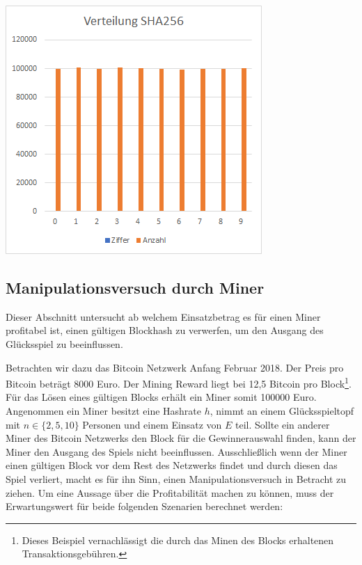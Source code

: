 \begin{minipage}{0.5\textwidth}
\includegraphics[width=\textwidth]{Figures/verteilung_sha256}
\centering
\decoRule
{}
\label{fig:verteilung_sha256}
\end{minipage}


\subsection{Manipulationsversuch durch Miner} \label{btc_eval_miner}
Dieser Abschnitt untersucht ab welchem Einsatzbetrag es für einen Miner profitabel ist, einen gültigen Blockhash zu verwerfen, um den Ausgang des Glücksspiel zu beeinflussen.

Betrachten wir dazu das Bitcoin Netzwerk Anfang Februar 2018. Der Preis pro Bitcoin beträgt 8000 Euro. Der Mining Reward liegt bei 12,5 Bitcoin pro Block\footnote{Dieses Beispiel vernachlässigt die durch das Minen des Blocks erhaltenen Transaktionsgebühren.}. Für das Lösen eines gültigen Blocks erhält ein Miner somit 100000 Euro.
Angenommen ein Miner besitzt eine Hashrate $h$, nimmt an einem Glücksspieltopf mit $n\in\{2, 5, 10\}$ Personen und einem Einsatz von $E$ teil. 
Sollte ein anderer Miner des Bitcoin Netzwerks den Block für die Gewinnerauswahl finden, kann der Miner den Ausgang des Spiels nicht beeinflussen. Ausschließlich wenn der Miner einen gültigen Block vor dem Rest des Netzwerks findet und durch diesen das Spiel verliert, macht es für ihn Sinn, einen Manipulationsversuch in Betracht zu ziehen. Um eine Aussage über die Profitabilität machen zu können, muss der Erwartungswert für beide folgenden Szenarien berechnet werden:

